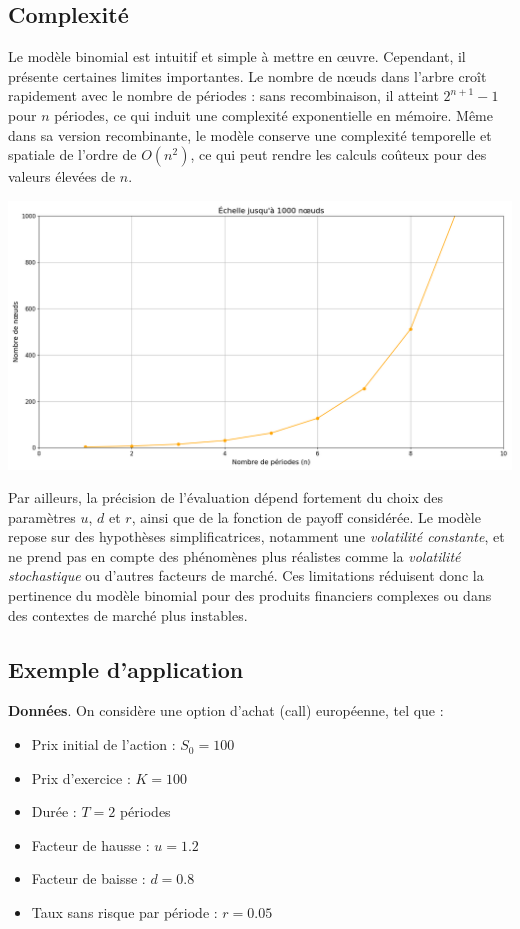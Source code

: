 \documentclass[12pt,a4paper]{article}
\begin{document}
\subsection{Complexité}
Le modèle binomial est intuitif et simple à mettre en œuvre. Cependant, il présente certaines limites importantes. Le nombre de nœuds dans l’arbre croît rapidement avec le nombre de périodes : sans recombinaison, il atteint \(2^{n+1} - 1\) pour \(n\) périodes, ce qui induit une complexité exponentielle en mémoire. Même dans sa version recombinante, le modèle conserve une complexité temporelle et spatiale de l’ordre de \(O(n^2)\), ce qui peut rendre les calculs coûteux pour des valeurs élevées de \(n\).

\begin{center}
    \includegraphics[width=1\textwidth]{lim.png}
\end{center}

Par ailleurs, la précision de l’évaluation dépend fortement du choix des paramètres \(u\), \(d\) et \(r\), ainsi que de la fonction de payoff considérée. Le modèle repose sur des hypothèses simplificatrices, notamment une \textit{volatilité constante}, et ne prend pas en compte des phénomènes plus réalistes comme la \textit{volatilité stochastique} ou d’autres facteurs de marché. Ces limitations réduisent donc la pertinence du modèle binomial pour des produits financiers complexes ou dans des contextes de marché plus instables.

\subsection{Exemple d'application}
\noindent \textbf{Données}. On considère une option d’achat (call) européenne, tel que :

\begin{itemize}
    \item Prix initial de l’action : $S_0 = 100$
    \item Prix d’exercice : $K = 100$
    \item Durée : $T = 2$ périodes
    \item Facteur de hausse : $u = 1.2$
    \item Facteur de baisse : $d = 0.8$
    \item Taux sans risque par période : $r = 0.05$
\end{itemize}
\end{document}
